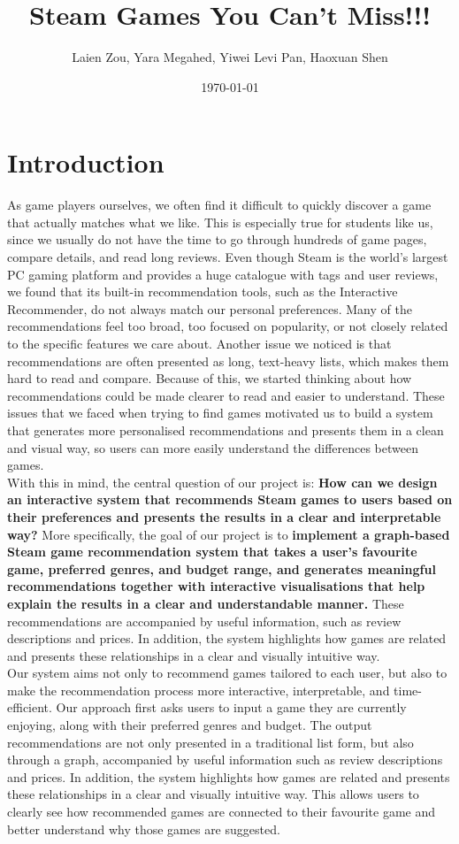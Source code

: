 \documentclass[fontsize=11pt]{article}
\title{Steam Games You Can’t Miss!!!}
\author{Laien Zou, Yara Megahed, Yiwei Levi Pan, Haoxuan Shen}
\date{\today}
\begin{document}
\maketitle

\section*{Introduction}

As game players ourselves, we often find it difficult to quickly discover a game that actually matches what we like. This is especially true for students like us, since we usually do not have the time to go through hundreds of game pages, compare details, and read long reviews. Even though Steam is the world’s largest PC gaming platform and provides a huge catalogue with tags and user reviews, we found that its built-in recommendation tools, such as the Interactive Recommender, do not always match our personal preferences. Many of the recommendations feel too broad, too focused on popularity, or not closely related to the specific features we care about. Another issue we noticed is that recommendations are often presented as long, text-heavy lists, which makes them hard to read and compare. Because of this, we started thinking about how recommendations could be made clearer to read and easier to understand. These issues that we faced when trying to find games motivated us to build a system that generates more personalised recommendations and presents them in a clean and visual way, so users can more easily understand the differences between games.\\

With this in mind, the central question of our project is: \textbf{How can we design an interactive system that recommends Steam games to users based on their preferences and presents the results in a clear and interpretable way?} More specifically, the goal of our project is to \textbf{implement a graph-based Steam game recommendation system that takes a user’s favourite game, preferred genres, and budget range, and generates meaningful recommendations together with interactive visualisations that help explain the results in a clear and understandable manner.} These recommendations are accompanied by useful information, such as review descriptions and prices. In addition, the system highlights how games are related and presents these relationships in a clear and visually intuitive way.\\

Our system aims not only to recommend games tailored to each user, but also to make the recommendation process more interactive, interpretable, and time-efficient. Our approach first asks users to input a game they are currently enjoying, along with their preferred genres and budget. The output recommendations are not only presented in a traditional list form, but also through a graph, accompanied by useful information such as review descriptions and prices. In addition, the system highlights how games are related and presents these relationships in a clear and visually intuitive way. This allows users to clearly see how recommended games are connected to their favourite game and better understand why those games are suggested.
\end{document}
